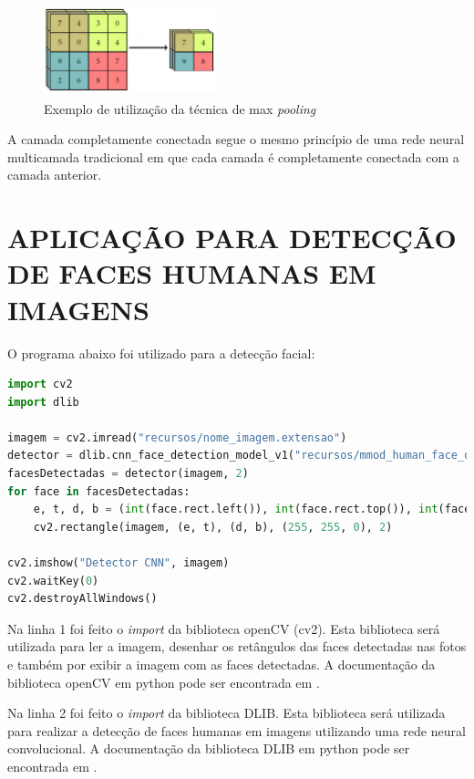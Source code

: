\documentclass[conference]{IEEEtran}
\begin{document}
       \begin{figure}[h!b]
			\centering \includegraphics[width=5cm,height=2.7cm]{max-pooling.jpg}
			\caption{Exemplo de utilização da técnica de max \textit{pooling} \cite{b2}} 
		\end{figure}         
         
          A camada completamente conectada segue o mesmo princípio de uma rede neural multicamada tradicional em que cada camada é completamente conectada com a camada anterior.             
         
	 \section{APLICAÇÃO PARA DETECÇÃO DE FACES HUMANAS EM IMAGENS}
	 
          O programa abaixo foi utilizado para a detecção facial:	   
         
	\begin{lstlisting}[breaklines=true, language=Python, caption=Programa utilizado para detecção facial]
import cv2
import dlib

imagem = cv2.imread("recursos/nome_imagem.extensao")
detector = dlib.cnn_face_detection_model_v1("recursos/mmod_human_face_detector.dat")
facesDetectadas = detector(imagem, 2)
for face in facesDetectadas:
    e, t, d, b = (int(face.rect.left()), int(face.rect.top()), int(face.rect.right()), int(face.rect.bottom()))
    cv2.rectangle(imagem, (e, t), (d, b), (255, 255, 0), 2)

cv2.imshow("Detector CNN", imagem)
cv2.waitKey(0)
cv2.destroyAllWindows()\end{lstlisting}


         Na linha 1 foi feito o \textit{import} da biblioteca openCV (cv2). Esta biblioteca será utilizada para ler a imagem, desenhar os retângulos das faces detectadas nas fotos e também por exibir a imagem com as faces detectadas. A documentação da biblioteca openCV em python pode ser encontrada em \cite{b3}.
         
         Na linha 2 foi feito o \textit{import} da biblioteca DLIB. Esta biblioteca será utilizada para realizar a detecção de faces humanas em imagens utilizando uma rede neural convolucional. A documentação da biblioteca DLIB em python pode ser encontrada em \cite{b4}.
         
\end{document}
